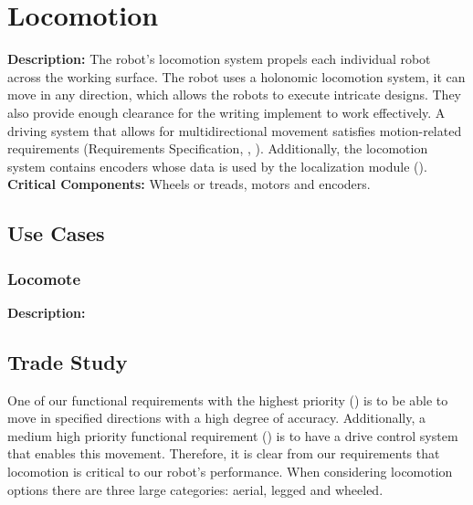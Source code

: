 
\section{Locomotion}
\label{sec:locomotion}
\textbf{Description:} The robot's locomotion system propels each individual robot across the working surface. The robot uses a holonomic locomotion system, it can move in any direction, which allows the robots to execute intricate designs.  They also provide enough clearance for the writing implement to work effectively. A driving system that allows for multidirectional movement satisfies motion-related requirements (Requirements Specification, , ). Additionally, the locomotion system contains encoders whose data is used by the localization module (). \\

\noindent
\textbf{Critical Components:} Wheels or treads, motors and encoders.

\subsection{Use Cases}
\subsubsection{Locomote}
\textbf{Description:} 

\subsection{Trade Study}
\label{sec:trade_locomotion}
One of our functional requirements with the highest priority () is to be able to move in specified directions with a high degree of accuracy. Additionally, a medium high priority functional requirement () is to have a drive control system that enables this movement. Therefore, it is clear from our requirements that locomotion is critical to our robot's performance. When considering locomotion options there are three large categories: aerial, legged and wheeled.

